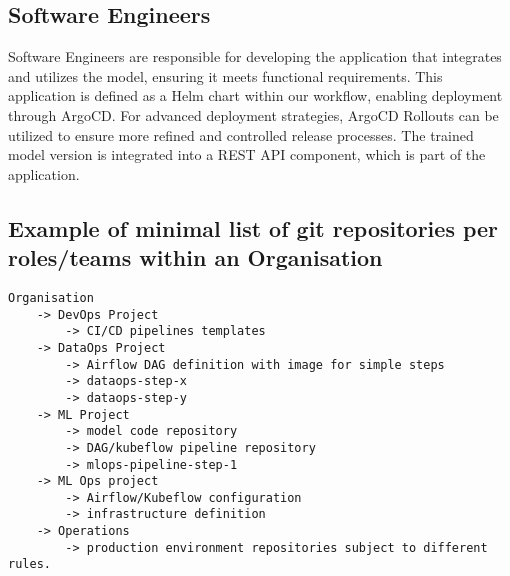 \subsection{Software Engineers}
Software Engineers are responsible for developing the application that integrates and utilizes the model,
ensuring it meets functional requirements.
This application is defined as a Helm chart within our workflow, enabling deployment through ArgoCD.
For advanced deployment strategies, ArgoCD Rollouts can be utilized to ensure more refined and controlled release processes.
The trained model version is integrated into a REST API component, which is part of the application.

\subsection{Example of minimal list of git repositories per roles/teams within an Organisation}

\begin{verbatim}
Organisation
    -> DevOps Project
        -> CI/CD pipelines templates
    -> DataOps Project
        -> Airflow DAG definition with image for simple steps
        -> dataops-step-x
        -> dataops-step-y
    -> ML Project
        -> model code repository
        -> DAG/kubeflow pipeline repository
        -> mlops-pipeline-step-1
    -> ML Ops project
        -> Airflow/Kubeflow configuration
        -> infrastructure definition
    -> Operations
        -> production environment repositories subject to different rules.
\end{verbatim}

